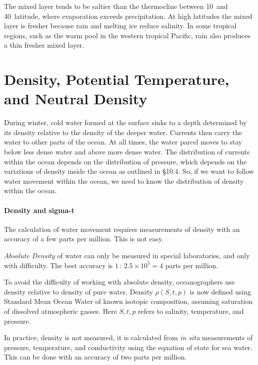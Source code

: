 The mixed layer tends to be saltier than the
thermocline between 10\degrees\ and
40\degrees\ latitude, where evaporation exceeds precipitation. At high
latitudes the mixed layer is fresher
because rain and melting ice reduce salinity. In some tropical
regions, such as the warm pool in the western tropical Pacific, rain
also produces a thin fresher mixed layer.

\section[Density]{Density, Potential Temperature, and Neutral Density}
During winter, cold water formed at the surface sinks to a depth
determined by its density relative to the density of the deeper
water. Currents then carry the water to other parts of the ocean. At
all times, the water parcel moves to stay below less dense water and
above more dense water. The distribution of currents within the ocean
depends on the distribution of pressure, which depends on the
variations of density inside the ocean as outlined in \S10.4. So, if
we want to follow water movement within the ocean, we need to know the
distribution of density within the ocean.

\paragraph{Density and sigma-t}
The calculation of water movement requires measurements
of density with an accuracy of a few parts per
million. This is not easy.

\textit{Absolute Density} of water can
only be measured in special laboratories, and only with
difficulty. The best accuracy is $1\,:\, 2.5 \times 10^5 = 4$ parts
per million.

To avoid the difficulty of working with absolute density,
oceanographers use density relative to density of pure water. Density
$\rho (S, t, p)$ is now defined using Standard Mean Ocean Water of
known isotopic composition, assuming saturation of dissolved
atmospheric gasses. Here $S, t, p$ refers to salinity, temperature,
and pressure.

In practice, density is not measured, it is calculated from \textit{in
  situ}  measurements of pressure, temperature, and
conductivity using the equation of state for sea water. This can be
done with an accuracy of two parts per
million.

